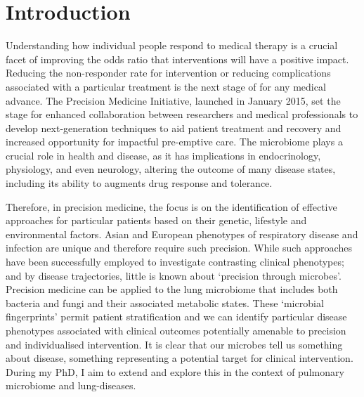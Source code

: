 \chapter*{Introduction}

Understanding how individual people respond to medical therapy is a crucial facet of improving the odds ratio that interventions will have a positive impact. Reducing the non-responder rate for intervention or reducing complications associated with a particular treatment is the next stage of for any medical advance. The Precision Medicine Initiative, launched in January 2015, set the stage for enhanced collaboration between researchers and medical professionals to develop next-generation techniques to aid patient treatment and recovery and increased opportunity for impactful pre-emptive care. The microbiome plays a crucial role in health and disease, as it has implications in endocrinology, physiology, and even neurology, altering the outcome of many disease states, including its ability to augments drug response and tolerance.

Therefore, in precision medicine, the focus is on the identification of effective approaches for particular patients based on their genetic, lifestyle and environmental factors. Asian and European phenotypes of respiratory disease and infection are unique and therefore require such precision. While such approaches have been successfully employed to investigate contrasting clinical phenotypes; and by disease trajectories, little is known about `precision through microbes'. Precision medicine can be applied to the lung microbiome that includes both bacteria and fungi and their associated metabolic states. These `microbial fingerprints' permit patient stratification and we can identify particular disease phenotypes associated with clinical outcomes potentially amenable to precision and individualised intervention. It is clear that our microbes tell us something about disease, something representing a potential target for clinical intervention. During my PhD, I aim to extend and explore this in the context of pulmonary microbiome and lung-diseases. 

